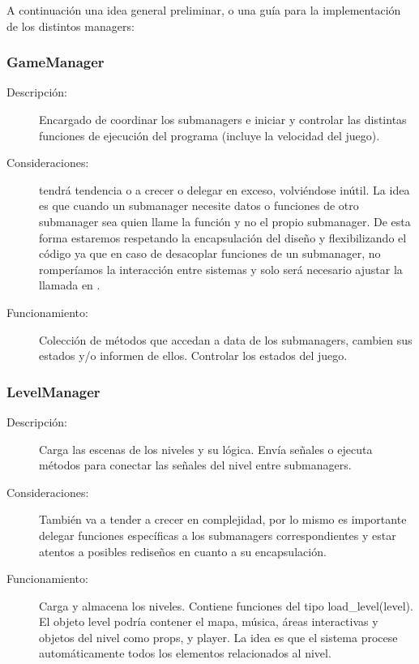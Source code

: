 A continuación una idea general preliminar, o una guía para la implementación de los distintos managers:

\subsubsection{GameManager}\label{modelado:gamemanager}

\begin{description}%
	\item[Descripción:] Encargado de coordinar los submanagers e iniciar y controlar las distintas funciones de ejecución del programa (incluye la velocidad del juego).
	
	\item[Consideraciones:]  tendrá tendencia o a crecer o delegar en exceso, volviéndose inútil. La idea es que cuando un submanager necesite datos o funciones de otro submanager sea  quien llame la función y no el propio submanager. De esta forma estaremos respetando la encapsulación del diseño y flexibilizando el código ya que en caso de desacoplar funciones de un submanager, no romperíamos la interacción entre sistemas y solo será necesario ajustar la llamada en .
	
	\item[Funcionamiento:] Colección de métodos que accedan a data de los submanagers, cambien sus estados y/o informen de ellos. Controlar los estados del juego.
\end{description}
	
\subsubsection{LevelManager}\label{modelado:levelmanager}
\begin{description}
	\item[Descripción:]	Carga las escenas  de los niveles y su lógica. Envía señales o ejecuta métodos para conectar las señales del nivel entre submanagers.
	
	\item[Consideraciones:] También va a tender a crecer en complejidad, por lo mismo es importante delegar funciones específicas a los submanagers correspondientes y estar atentos a posibles rediseños en cuanto a su encapsulación.
	
	\item[Funcionamiento:] Carga y almacena los niveles. Contiene funciones del tipo load\_level(level). El objeto level podría contener el mapa, música, áreas interactivas y objetos del nivel como props,  y player. La idea es que el sistema procese automáticamente todos los elementos relacionados al nivel.
\end{description}
	
